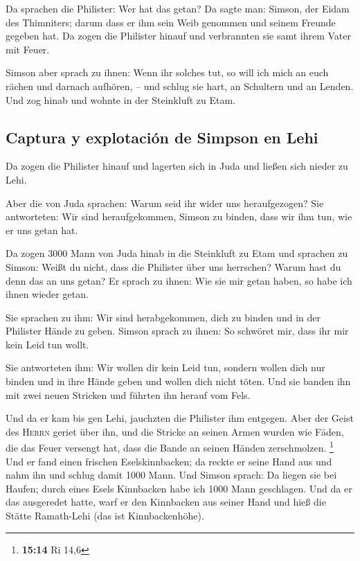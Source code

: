  Da sprachen die Philister: Wer hat das getan? Da sagte
man: Simson, der Eidam des Thimniters; darum dass er ihm sein Weib
genommen und seinem Freunde gegeben hat. Da zogen die Philister hinauf
und verbrannten sie samt ihrem Vater mit Feuer.

 Simson aber sprach zu ihnen: Wenn ihr solches tut, so
will ich mich an euch rächen und darnach aufhören, --  und
schlug sie hart, an Schultern und an Lenden. Und zog hinab und wohnte in
der Steinkluft zu Etam.

\hypertarget{captura-y-explotaciuxf3n-de-simpson-en-lehi}{%
\subsection{Captura y explotación de Simpson en
Lehi}\label{captura-y-explotaciuxf3n-de-simpson-en-lehi}}

 Da zogen die Philister hinauf und lagerten sich in Juda
und ließen sich nieder zu Lehi.

 Aber die von Juda sprachen: Warum seid ihr wider uns
heraufgezogen? Sie antworteten: Wir sind heraufgekommen, Simson zu
binden, dass wir ihm tun, wie er uns getan hat.

 Da zogen 3000 Mann von Juda hinab in die Steinkluft zu
Etam und sprachen zu Simson: Weißt du nicht, dass die Philister über uns
herrschen? Warum hast du denn das an uns getan? Er sprach zu ihnen: Wie
sie mir getan haben, so habe ich ihnen wieder getan.

 Sie sprachen zu ihm: Wir sind herabgekommen, dich zu
binden und in der Philister Hände zu geben. Simson sprach zu ihnen: So
schwöret mir, dass ihr mir kein Leid tun wollt.

 Sie antworteten ihm: Wir wollen dir kein Leid tun,
sondern wollen dich nur binden und in ihre Hände geben und wollen dich
nicht töten. Und sie banden ihn mit zwei neuen Stricken und führten ihn
herauf vom Fels.

 Und da er kam bis gen Lehi, jauchzten die Philister ihm
entgegen. Aber der Geist des \textsc{Herrn} geriet über ihn, und die
Stricke an seinen Armen wurden wie Fäden, die das Feuer versengt hat,
dass die Bande an seinen Händen zerschmolzen. \footnote{\textbf{15:14}
  Ri 14,6}  Und er fand einen frischen Eselskinnbacken;
da reckte er seine Hand aus und nahm ihn und schlug damit 1000 Mann.
 Und Simson sprach: Da liegen sie bei Haufen; durch eines
Esels Kinnbacken habe ich 1000 Mann geschlagen.  Und da
er das ausgeredet hatte, warf er den Kinnbacken aus seiner Hand und hieß
die Stätte Ramath-Lehi (das ist Kinnbackenhöhe).

